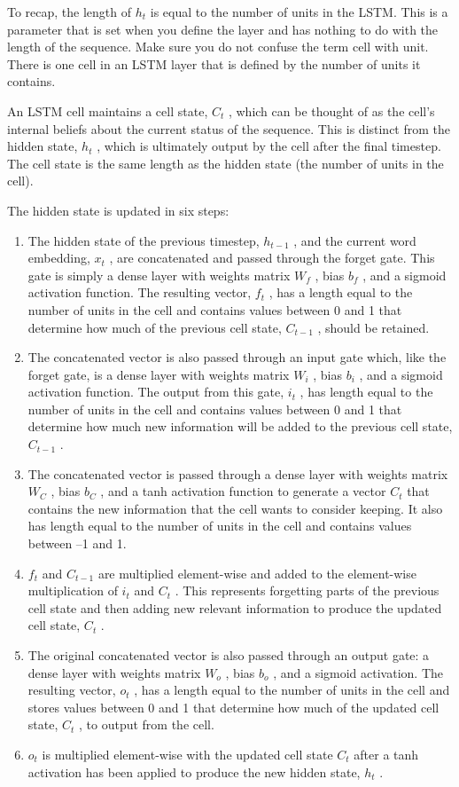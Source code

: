 \documentclass[french]{article}
\begin{document}
To recap, the length of $h_t$ is equal to the number of units in the LSTM. This is a parameter that is set when you define the layer and has nothing to do with the length of the sequence. Make sure you do not confuse the term cell with unit. There is one cell in an LSTM layer that is defined by the number of units it contains.

An LSTM cell maintains a cell state, $C_t$ , which can be thought of as the cell’s internal beliefs about the current status of the sequence. This is distinct from the hidden state, $h_t$ , which is ultimately output by the cell after the final timestep. The cell state is the same length as the hidden state (the number of units in the cell).

The hidden state is updated in six steps:

\begin{enumerate}
    \item The hidden state of the previous timestep, $h_{t-1}$ , and the current word embedding, $x_t$ , are concatenated and passed through the forget gate. This gate is simply a dense layer with weights matrix $W_f$ , bias $b_f$ , and a sigmoid activation function.  The resulting vector, $f_t$ , has a length equal to the number of units in the cell and contains values between 0 and 1 that determine how much of the previous cell state, $C_{t-1}$ , should be retained.
    \item The concatenated vector is also passed through an input gate which, like the forget gate, is a dense layer with weights matrix $W_i$ , bias $b_i$ , and a sigmoid activation function. The output from this gate, $i_t$ , has length equal to the number of units in the cell and contains values between 0 and 1 that determine how much new information will be added to the previous cell state, $C_{t-1}$ .
    \item The concatenated vector is passed through a dense layer with weights matrix $W_C$ , bias $b_C$ , and a tanh activation function to generate a vector $C_t$ that contains the new information that the cell wants to consider keeping. It also has length equal to the number of units in the cell and contains values between –1 and 1.
    \item $f_t$ and $C_{t-1}$ are multiplied element-wise and added to the element-wise multiplication of $i_t$ and $C_t$ . This represents forgetting parts of the previous cell state and then adding new relevant information to produce the updated cell state, $C_t$ .
    \item The original concatenated vector is also passed through an output gate: a dense layer with weights matrix $W_o$ , bias $b_o$ , and a sigmoid activation. The resulting vector, $o_t$ , has a length equal to the number of units in the cell and stores values between 0 and 1 that determine how much of the updated cell state, $C_t$ , to output from the cell.
    \item $o_t$ is multiplied element-wise with the updated cell state $C_t$ after a tanh activation has been applied to produce the new hidden state, $h_t$ .
\end{enumerate}
\end{document}
